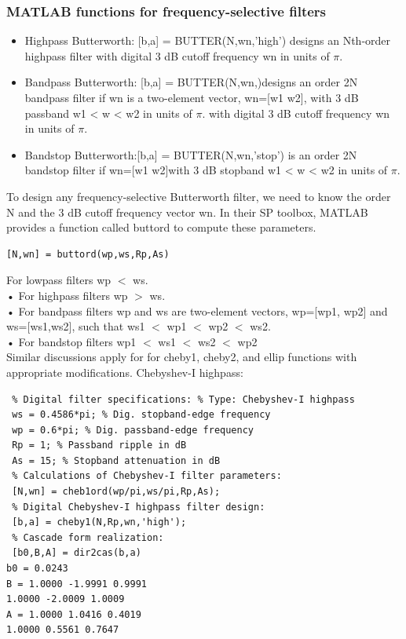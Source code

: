 \documentclass{article}
\begin{document}
\subsubsection{MATLAB functions for frequency-selective filters}
\begin{itemize}
    \item Highpass Butterworth: [b,a] = BUTTER(N,wn,'high') designs an Nth-order highpass filter
     with digital 3 dB cutoff frequency wn in units of $\pi$.
     \item Bandpass Butterworth: [b,a] = BUTTER(N,wn,)designs an order 2N bandpass filter if wn is a two-element vector, wn=[w1 w2], with 3 dB passband w1 < w < w2 in units of $\pi$.
     with digital 3 dB cutoff frequency wn in units of $\pi$.
     \item Bandstop Butterworth:[b,a] = BUTTER(N,wn,'stop') is an order 2N bandstop filter if wn=[w1 w2]with 3 dB stopband w1 < w < w2 in units of $\pi$.
\end{itemize}
To design any frequency-selective Butterworth filter, we need to know
the order N and the 3 dB cutoff frequency vector wn. In their SP toolbox, MATLAB provides a function called buttord to compute these parameters. 
\begin{lstlisting}
[N,wn] = buttord(wp,ws,Rp,As)    
\end{lstlisting}
For lowpass filters wp $<$ ws. \\
• For highpass filters wp $>$ ws. \\
• For bandpass filters wp and ws are two-element vectors, wp=[wp1,
wp2] and ws=[ws1,ws2], such that ws1 $<$ wp1 $<$ wp2 $<$ ws2. \\
• For bandstop filters wp1 $<$ ws1 $<$ ws2 $<$ wp2 \\
\vspace{1em}
Similar discussions apply for for cheby1, cheby2, and ellip functions with appropriate modifications.
\vspace{1em}
Chebyshev-I highpass:
\begin{lstlisting}
 % Digital filter specifications: % Type: Chebyshev-I highpass
 ws = 0.4586*pi; % Dig. stopband-edge frequency
 wp = 0.6*pi; % Dig. passband-edge frequency
 Rp = 1; % Passband ripple in dB
 As = 15; % Stopband attenuation in dB
 % Calculations of Chebyshev-I filter parameters:
 [N,wn] = cheb1ord(wp/pi,ws/pi,Rp,As);
 % Digital Chebyshev-I highpass filter design:
 [b,a] = cheby1(N,Rp,wn,'high');
 % Cascade form realization:
 [b0,B,A] = dir2cas(b,a)
b0 = 0.0243
B = 1.0000 -1.9991 0.9991
1.0000 -2.0009 1.0009
A = 1.0000 1.0416 0.4019
1.0000 0.5561 0.7647    
\end{lstlisting}
\end{document}
